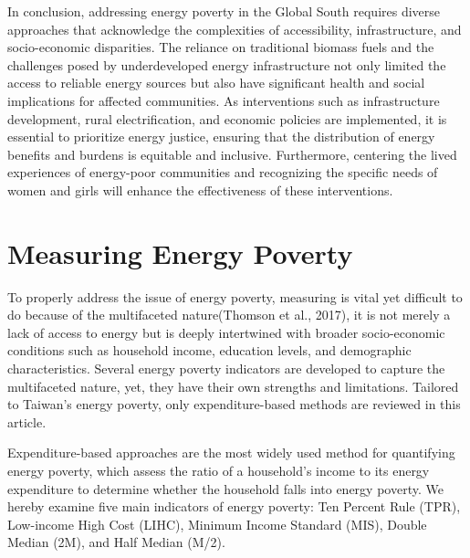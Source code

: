 \documentclass[
  twoside,
  openright,
  degree    = master,               %
  language  = english,              %
  fontset   = overleaf,             %
  watermark = true,                 %
  doi       = true,                 %
]{ntuthesis}
\begin{document}
In conclusion, addressing energy poverty in the Global South requires
diverse approaches that acknowledge the complexities of accessibility,
infrastructure, and socio-economic disparities. The reliance on
traditional biomass fuels and the challenges posed by underdeveloped
energy infrastructure not only limited the access to reliable energy
sources but also have significant health and social implications for
affected communities. As interventions such as infrastructure
development, rural electrification, and economic policies are
implemented, it is essential to prioritize energy justice, ensuring that
the distribution of energy benefits and burdens is equitable and
inclusive. Furthermore, centering the lived experiences of energy-poor
communities and recognizing the specific needs of women and girls will
enhance the effectiveness of these interventions.

\hypertarget{measuring-energy-poverty}{%
\section{Measuring Energy Poverty}\label{measuring-energy-poverty}}

To properly address the issue of energy poverty, measuring is vital yet
difficult to do because of the multifaceted nature(Thomson et al.,
2017), it is not merely a lack of access to energy but is deeply
intertwined with broader socio-economic conditions such as household
income, education levels, and demographic characteristics. Several
energy poverty indicators are developed to capture the multifaceted
nature, yet, they have their own strengths and limitations. Tailored to
Taiwan's energy poverty, only expenditure-based methods are reviewed in
this article.

Expenditure-based approaches are the most widely used method for
quantifying energy poverty, which assess the ratio of a household's
income to its energy expenditure to determine whether the household
falls into energy poverty. We hereby examine five main indicators of
energy poverty: Ten Percent Rule (TPR), Low-income High Cost (LIHC),
Minimum Income Standard (MIS), Double Median (2M), and Half Median
(M/2).
\end{document}
